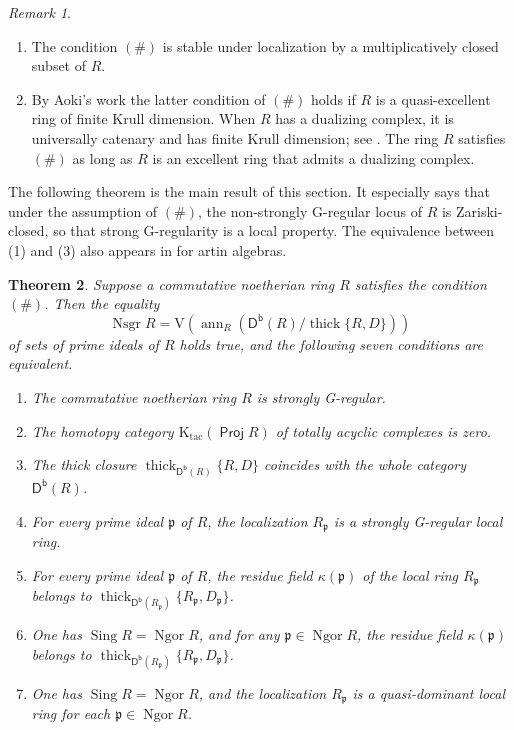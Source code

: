 \documentclass{amsart}
\newtheorem{thm}{Theorem}[section]
\theoremstyle{definition}
\theoremstyle{remark}
\newtheorem{rem}[thm]{Remark}
\numberwithin{equation}{thm}
\def\ann{\operatorname{ann}}
\def\Db{\operatorname{\mathsf{D^b}}}
\def\Ktac{\mathrm{K}_{\operatorname{tac}}}
\def\ng{\operatorname{Ngor}}
\def\nsgr{\operatorname{Nsgr}}
\def\Proj{\operatorname{\mathsf{Proj}}}
\def\p{\mathfrak{p}}
\def\sing{\operatorname{Sing}}
\def\thick{\operatorname{thick}}
\def\V{\mathrm{V}}
\begin{document}
\begin{rem}\label{9}
\begin{enumerate}[(1)]
\item
The condition $(\#)$ is stable under localization by a multiplicatively closed subset of $R$.
\item
By Aoki's work \cite{A21} the latter condition of $(\#)$ holds if $R$ is a quasi-excellent ring of finite Krull dimension.
When $R$ has a dualizing complex, it is universally catenary and has finite Krull dimension; see \cite[Chapter V, \S10]{H}.
The ring $R$ satisfies $(\#)$ as long as $R$ is an excellent ring that admits a dualizing complex.
\end{enumerate}
\end{rem}

The following theorem is the main result of this section.
It especially says that under the assumption of $(\#)$, the non-strongly G-regular locus of $R$ is Zariski-closed, so that strong G-regularity is a local property. 
The equivalence between (1) and (3) also appears in \cite[Theorem 1.3]{DLL26} for artin algebras.

\begin{thm}\label{str G-req quasi-dom}
Suppose a commutative noetherian ring $R$ satisfies the condition $(\#)$.
Then the equality
\begin{equation}\label{6}
\nsgr R=\V(\ann_R (\Db(R)/\thick\{R, D\}))
\end{equation}
of sets of prime ideals of $R$ holds true, and the following seven conditions are equivalent.
\begin{enumerate}[\rm(1)]
\item
The commutative noetherian ring $R$ is strongly G-regular.
\item
The homotopy category $\Ktac (\Proj R)$ of totally acyclic complexes is zero.
\item
The thick closure $\thick_{\Db(R)}\{R, D\}$ coincides with the whole category $\Db(R)$.
\item
For every prime ideal $\p$ of $R$, the localization $R_\p$ is a strongly G-regular local ring.
\item
For every prime ideal $\p$ of $R$, the residue field $\kappa(\p)$ of the local ring $R_\p$ belongs to $\thick_{\Db(R_\p)} \{R_\p, D_\p\}$.
\item
One has $\sing R=\ng R$, and for any $\p\in\ng R$, the residue field $\kappa(\p)$ belongs to $\thick_{\Db(R_\p)} \{R_\p, D_\p\}$.
\item
One has $\sing R=\ng R$, and the localization $R_\p$ is a quasi-dominant local ring for each $\p\in\ng R$.
\end{enumerate}
\end{thm}
\end{document}
